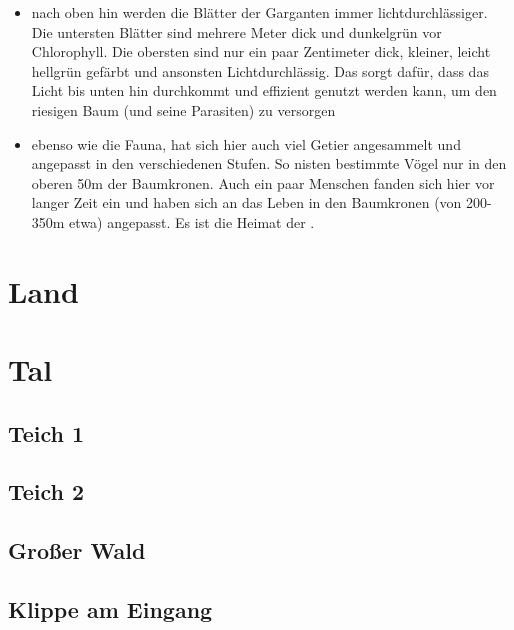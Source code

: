 \begin{itemize}
	\item nach oben hin werden die Blätter der Garganten immer lichtdurchlässiger. Die untersten Blätter sind mehrere Meter dick und dunkelgrün vor Chlorophyll. Die obersten sind nur ein paar Zentimeter dick, kleiner, leicht hellgrün gefärbt und ansonsten Lichtdurchlässig. Das sorgt dafür, dass das Licht bis unten hin durchkommt und effizient genutzt werden kann, um den riesigen Baum (und seine Parasiten) zu versorgen
	\item ebenso wie die Fauna, hat sich hier auch viel Getier angesammelt und angepasst in den verschiedenen Stufen. So nisten bestimmte Vögel nur in den oberen 50m der Baumkronen. Auch ein paar Menschen fanden sich hier vor langer Zeit ein und haben sich an das Leben in den Baumkronen (von 200-350m etwa) angepasst. Es ist die Heimat der .
\end{itemize}

\section{Land}
\section{Tal}
\subsection{Teich 1}
\subsection{Teich 2}
\subsection{Großer Wald}
\subsection{Klippe am Eingang}

